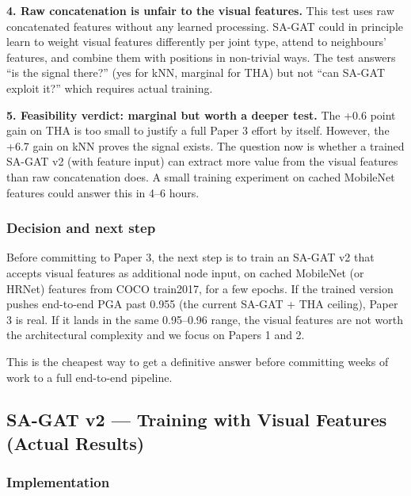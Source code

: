 \textbf{4. Raw concatenation is unfair to the visual features.} This test uses raw concatenated features without any learned processing. SA-GAT could in principle learn to weight visual features differently per joint type, attend to neighbours' features, and combine them with positions in non-trivial ways. The test answers ``is the signal there?'' (yes for kNN, marginal for THA) but not ``can SA-GAT exploit it?'' which requires actual training.

\textbf{5. Feasibility verdict: marginal but worth a deeper test.} The +0.6 point gain on THA is too small to justify a full Paper 3 effort by itself. However, the +6.7 gain on kNN proves the signal exists. The question now is whether a trained SA-GAT v2 (with feature input) can extract more value from the visual features than raw concatenation does. A small training experiment on cached MobileNet features could answer this in 4--6 hours.

\subsubsection{Decision and next step}

Before committing to Paper 3, the next step is to train an SA-GAT v2 that accepts visual features as additional node input, on cached MobileNet (or HRNet) features from COCO train2017, for a few epochs. If the trained version pushes end-to-end PGA past 0.955 (the current SA-GAT + THA ceiling), Paper 3 is real. If it lands in the same 0.95--0.96 range, the visual features are not worth the architectural complexity and we focus on Papers 1 and 2.

This is the cheapest way to get a definitive answer before committing weeks of work to a full end-to-end pipeline.


\subsection{SA-GAT v2 --- Training with Visual Features (Actual Results)}

\subsubsection{Implementation}

